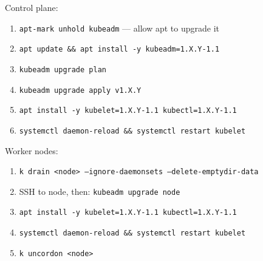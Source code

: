 \begin{tcbitemize}[
  raster columns=2, raster equal height=rows,
  blanker, cheat subtitle
]
\begin{tcbitemize}[
      raster columns=1, raster equal height=rows,
      blanker, cheat subtitle
    ]
      \tcbitem
          {\fontsize{6.5}{7.5}\selectfont\sffamily
          Control plane:
          \begin{enumerate}[leftmargin=1.2em, itemsep=0pt, parsep=0pt, topsep=1pt]
            \item \texttt{apt-mark unhold kubeadm} — allow apt to upgrade it
            \item \texttt{apt update \&\& apt install -y kubeadm=1.X.Y-1.1}
            \item \texttt{kubeadm upgrade plan}
            \item \texttt{kubeadm upgrade apply v1.X.Y}
            \item \texttt{apt install -y kubelet=1.X.Y-1.1 kubectl=1.X.Y-1.1}
            \item \texttt{systemctl daemon-reload \&\& systemctl restart kubelet}
          \end{enumerate}
          Worker nodes:
          \begin{enumerate}[leftmargin=1.2em, itemsep=0pt, parsep=0pt, topsep=1pt]
            \item \texttt{k drain <node> --ignore-daemonsets --delete-emptydir-data}
            \item SSH to node, then: \texttt{kubeadm upgrade node}
            \item \texttt{apt install -y kubelet=1.X.Y-1.1 kubectl=1.X.Y-1.1}
            \item \texttt{systemctl daemon-reload \&\& systemctl restart kubelet}
            \item \texttt{k uncordon <node>}
          \end{enumerate}}


\end{tcbitemize}
\end{tcbitemize}

